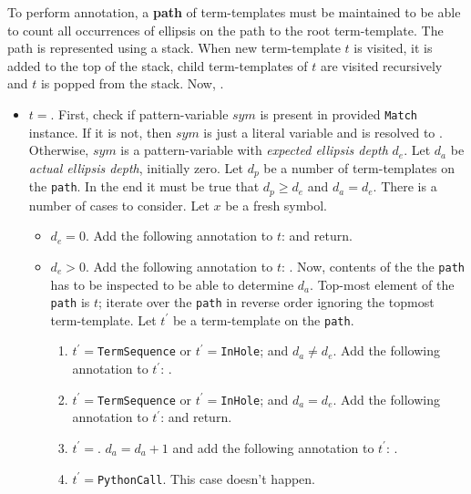 To perform annotation, a \textbf{path} of term-templates must be maintained to be able to count all occurrences of ellipsis on the path to the root term-template. The path is represented using a stack. When new term-template $t$ is visited, it is added to the top of the stack, child term-templates of $t$ are visited recursively and $t$ is popped from the stack. Now, .
\begin{itemize}

\item
$t=$\TermUnresolvedSymbol. First, check if pattern-variable $sym$ is present in provided \texttt{Match} instance. If it is not, then $sym$ is just a literal variable and is resolved to .
Otherwise, $sym$ is a pattern-variable with \textit{expected ellipsis depth} $d_e$. Let $d_a$ be \textit{actual ellipsis depth}, initially zero. Let $d_p$ be a number of \RepeatNoArg term-templates on the \texttt{path}. In the end it must be true that $d_p \geq d_e$ and $d_a = d_e$. There is a number of cases to consider. Let $x$ be a fresh symbol.
	\begin{itemize}
	\item
	$d_e=0$. Add the following annotation to $t$:  and return.
	\item
	$d_e>0$. Add the following annotation to $t$: . Now, contents of the the \texttt{path} has to be inspected to be able to determine $d_a$. Top-most element of the \texttt{path} is $t$; iterate over the \texttt{path} in reverse order ignoring the topmost term-template. Let $t^{\prime}$ be a term-template on the \texttt{path}.
		\begin{enumerate}
		\item
		$t^{\prime}=$\texttt{TermSequence} or $t^{\prime}=$\texttt{InHole}; and $d_a \neq d_e$. Add the following annotation to $t^{\prime}$: .
		\item
		$t^{\prime}=$\texttt{TermSequence} or $t^{\prime}=$\texttt{InHole}; and $d_a = d_e$.  Add the following annotation to $t^{\prime}$:  and return.
		\item
		$t^{\prime}=$\RepeatNoArg. $d_a = d_a + 1$ and add the following annotation to $t^{\prime}$: .
		\item
		$t^{\prime}=$\texttt{PythonCall}. This case doesn't happen.
		\end{enumerate}

\end{itemize}
\end{itemize}
